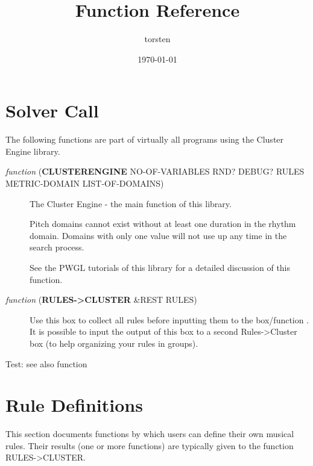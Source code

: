 

\usepackage{color}
\usepackage{listings}
\author{torsten}
\date{\today}
\title{Function Reference}


\maketitle

\section*{Solver Call}
\label{sec:org118b3fd}

The following functions are part of virtually all programs using the Cluster Engine library.

\begin{description}
\item[{ \emph{function} (\textbf{CLUSTERENGINE} NO-OF-VARIABLES RND? DEBUG? RULES METRIC-DOMAIN LIST-OF-DOMAINS)}] The Cluster Engine - the main function of this library. 

Pitch domains cannot exist without at least one duration in the rhythm domain. Domains with only one value will not use up any time in the search process.

See the PWGL tutorials of this library for a detailed discussion of this function.
\end{description}



\begin{description}
\item[{ \emph{function} (\textbf{RULES->CLUSTER} \&REST RULES)}] Use this box to collect all rules before inputting them to the box/function . It is possible to input the output of this box to a second Rules->Cluster box (to help organizing your rules in groups).
\end{description}


Test: see also function  


\section*{Rule Definitions}
\label{sec:orge56e057}

This section documents functions by which users can define their own musical rules. Their results (one or more functions) are typically given to the function RULES->CLUSTER. 


